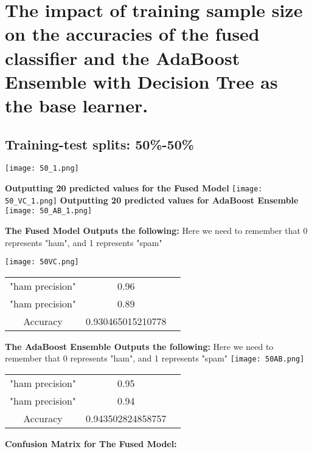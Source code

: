 \documentclass{article}
\begin{document}
\section{The impact of training sample size on the accuracies of the fused classifier and the AdaBoost Ensemble with Decision Tree as the base learner.}

\subsection{Training-test splits: 50\%-50\%}
\texttt{[image: 50\_1.png]}

\vspace{0.5cm}
\textbf{Outputting 20 predicted values for the Fused Model}
\vspace{0.5cm}
\texttt{[image: 50\_VC\_1.png]}
\textbf{Outputting 20 predicted values for AdaBoost Ensemble}
\vspace{0.5cm}
\texttt{[image: 50\_AB\_1.png]}

\textbf{The Fused Model Outputs the following: }
Here we need to remember that 0 represents "ham", and 1 represents "spam"


\texttt{[image: 50VC.png]}


\begin{center}
\begin{tabular}{ |c|c|c| } 
 \hline
 "ham precision" & 0.96  \\ 
 "ham precision" & 0.89 \\ 
 Accuracy  & 0.930465015210778 \\ 
 \hline
\end{tabular}
\end{center}
\vspace{8cm}
\textbf{The AdaBoost Ensemble Outputs the following: }
Here we need to remember that 0 represents "ham", and 1 represents "spam"
\texttt{[image: 50AB.png]}
\begin{center}
\begin{tabular}{ |c|c|c| } 
 \hline
 "ham precision" & 0.95  \\ 
 "ham precision" & 0.94 \\ 
 Accuracy  & 0.943502824858757 \\ 
 \hline
\end{tabular}
\end{center}
\vspace{16cm}
\centering
\textbf{Confusion Matrix for The Fused Model: }
\vspace{0.5cm}
\end{document}
